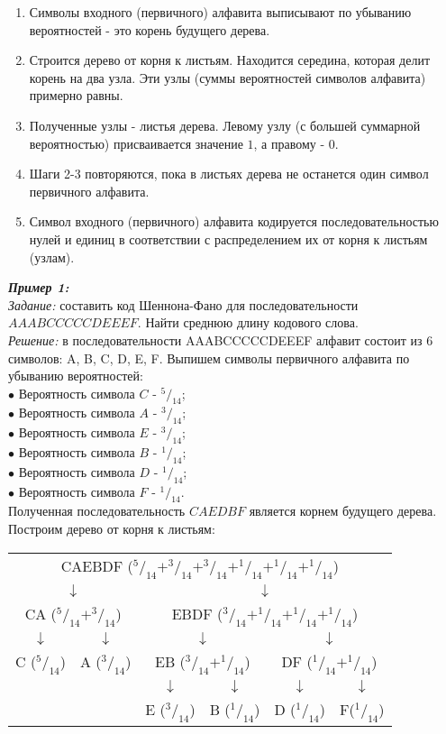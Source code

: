 \begin{enumerate}
\item Символы входного (первичного) алфавита выписывают по убыванию вероятностей - это корень будущего дерева.
\item Строится дерево от корня к листьям. Находится середина, которая делит корень на два узла. Эти узлы (суммы вероятностей символов алфавита) примерно равны.
\item Полученные узлы - листья дерева. Левому узлу (с большей суммарной вероятностью) присваивается значение $1$, а правому - $0$.
\item Шаги 2-3 повторяются, пока в листьях дерева не останется один символ первичного алфавита.
\item Символ входного (первичного) алфавита кодируется последовательностью нулей и единиц в соответствии с распределением их от корня к листьям (узлам).
\end{enumerate}
\emph{\textbf{Пример 1:}}
\\\emph{Задание:} составить код Шеннона-Фано для последовательности
\\$AAABCCCCCDEEEF$. Найти среднюю длину кодового слова.
\\\emph{Решение:} в последовательности AAABCCCCCDEEEF алфавит состоит из 6 символов: A, B, C, D, E, F. Выпишем символы первичного алфавита по убыванию вероятностей:
\\$\bullet$ Вероятность символа $C$ - $^5/_{14}$;
\\$\bullet$ Вероятность символа $A$ - $^3/_{14}$;
\\$\bullet$ Вероятность символа $E$ - $^3/_{14}$;
\\$\bullet$ Вероятность символа $B$ - $^1/_{14}$;
\\$\bullet$ Вероятность символа $D$ - $^1/_{14}$;
\\$\bullet$ Вероятность символа $F$ - $^1/_{14}$.
\\Полученная последовательность $CAEDBF$ является корнем будущего дерева.
\\Построим дерево от корня к листьям:
\begin{table}[h]
\centering
\begin{tabular}{c c c c c c}
\multicolumn{6}{c}{CAEBDF ($^5/_{14} + ^3/_{14} + ^3/_{14} + ^1/_{14} + ^1/_{14} + ^1/_{14}$)} \\
\multicolumn{2}{c}{$\downarrow$} & \multicolumn{4}{c}{$\downarrow$} \\
\multicolumn{2}{c}{CA ($^5/_{14} + ^3/_{14}$)} & \multicolumn{4}{c}{EBDF ($^3/_{14} + ^1/_{14} + ^1/_{14} + ^1/_{14}$)} \\
$\downarrow$ & $\downarrow$ & \multicolumn{2}{c}{$\downarrow$} & \multicolumn{2}{c}{$\downarrow$} \\
C ($^5/_{14}$) & A ($^3/_{14}$) & \multicolumn{2}{c}{EB ($^3/_{14} + ^1/_{14}$)} & \multicolumn{2}{c}{DF ($^1/_{14} + ^1/_{14}$)} \\
 & & $\downarrow$ & $\downarrow$ & $\downarrow$ & $\downarrow$ \\
 & & E ($^3/_{14}$) & B ($^1/_{14}$) & D ($^1/_{14}$) & F($^1/_{14}$) \\
\end{tabular}
\end{table}
